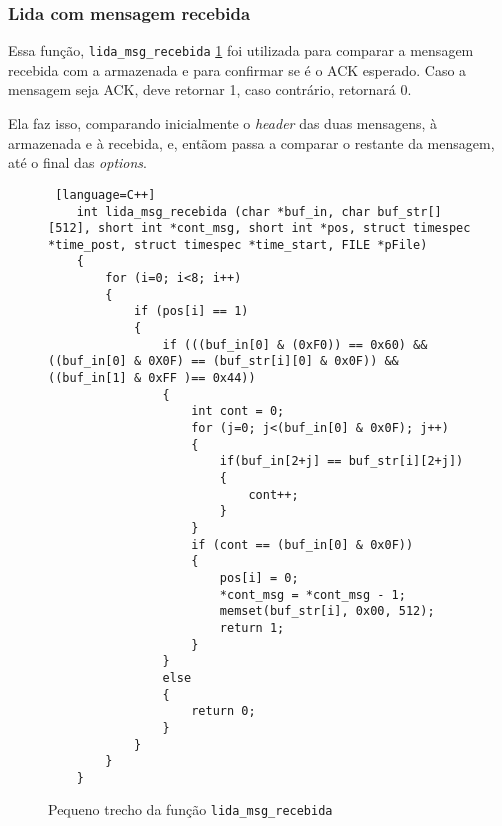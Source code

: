 \subsubsection{Lida com mensagem recebida}

Essa função, \texttt{lida\_msg\_recebida} \ref{code:lida_msg_recebida} foi utilizada para comparar a mensagem recebida com a armazenada e para confirmar se é o ACK esperado. Caso a mensagem seja ACK, deve retornar 1, caso contrário, retornará 0.

Ela faz isso, comparando inicialmente o \textit{header} das duas mensagens, à armazenada e à recebida, e, entãom passa a comparar o restante da mensagem, até o final das \textit{options}.

\begin{figure}[!htb]
	\begin{lstlisting} [language=C++]
	int lida_msg_recebida (char *buf_in, char buf_str[][512], short int *cont_msg, short int *pos, struct timespec *time_post, struct timespec *time_start, FILE *pFile)
	{
		for (i=0; i<8; i++)
		{
			if (pos[i] == 1)
			{
				if (((buf_in[0] & (0xF0)) == 0x60) && ((buf_in[0] & 0X0F) == (buf_str[i][0] & 0x0F)) && ((buf_in[1] & 0xFF )== 0x44))
				{
					int cont = 0;
					for (j=0; j<(buf_in[0] & 0x0F); j++)
					{
						if(buf_in[2+j] == buf_str[i][2+j])
						{
							cont++;
						}
					}
					if (cont == (buf_in[0] & 0x0F))
					{
						pos[i] = 0;
						*cont_msg = *cont_msg - 1;
						memset(buf_str[i], 0x00, 512);
						return 1;
					}
				}
				else
				{
					return 0;
				}
			}
		}
	}
	\end{lstlisting}
	\caption{Pequeno trecho da função \texttt{lida\_msg\_recebida}}
\label{code:lida_msg_recebida}
\end{figure}

\hfill \break
\hfill \break
\hfill \break
\hfill \break
\hfill \break
\hfill \break
\hfill \break
\hfill \break
\hfill \break


